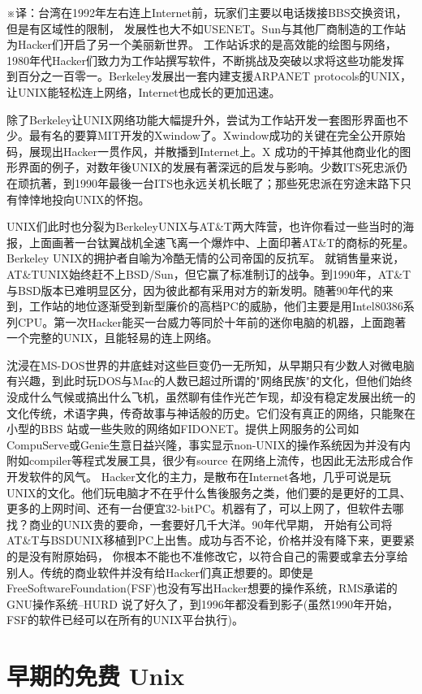 \documentclass[a4paper,12pt,UTF8,twoside]{ctexbook}
\begin{document}
※译：台湾在1992年左右连上Internet前，玩家们主要以电话拨接BBS交换资讯，但是有区域性的限制， 发展性也大不如USENET。Sun与其他厂商制造的工作站为Hacker们开启了另一个美丽新世界。 工作站诉求的是高效能的绘图与网络，1980年代Hacker们致力为工作站撰写软件，不断挑战及突破以求将这些功能发挥到百分之一百零一。Berkeley发展出一套内建支援ARPANET protocols的UNIX，让UNIX能轻松连上网络，Internet也成长的更加迅速。

除了Berkeley让UNIX网络功能大幅提升外，尝试为工作站开发一套图形界面也不少。最有名的要算MIT开发的Xwindow了。Xwindow成功的关键在完全公开原始码，展现出Hacker一贯作风，并散播到Internet上。X 成功的干掉其他商业化的图形界面的例子，对数年後UNIX的发展有著深远的启发与影响。少数ITS死忠派仍在顽抗著，到1990年最後一台ITS也永远关机长眠了；那些死忠派在穷途末路下只有悻悻地投向UNIX的怀抱。

UNIX们此时也分裂为BerkeleyUNIX与AT\&T两大阵营，也许你看过一些当时的海报，上面画著一台钛翼战机全速飞离一个爆炸中、上面印著AT\&T的商标的死星。Berkeley UNIX的拥护者自喻为冷酷无情的公司帝国的反抗军。 就销售量来说，AT\&TUNIX始终赶不上BSD/Sun，但它赢了标准制订的战争。到1990年，AT\&T与BSD版本已难明显区分，因为彼此都有采用对方的新发明。随著90年代的来到，工作站的地位逐渐受到新型廉价的高档PC的威胁，他们主要是用Intel80386系列CPU。第一次Hacker能买一台威力等同於十年前的迷你电脑的机器，上面跑著一个完整的UNIX，且能轻易的连上网络。

沈浸在MS-DOS世界的井底蛙对这些巨变仍一无所知，从早期只有少数人对微电脑有兴趣，到此时玩DOS与Mac的人数已超过所谓的"网络民族"的文化，但他们始终没成什么气候或搞出什么飞机，虽然聊有佳作光芒乍现，却没有稳定发展出统一的文化传统，术语字典，传奇故事与神话般的历史。它们没有真正的网络，只能聚在小型的BBS 站或一些失败的网络如FIDONET。提供上网服务的公司如CompuServe或Genie生意日益兴隆，事实显示non-UNIX的操作系统因为并没有内附如compiler等程式发展工具，很少有source 在网络上流传，也因此无法形成合作开发软件的风气。 Hacker文化的主力，是散布在Internet各地，几乎可说是玩UNIX的文化。他们玩电脑才不在乎什么售後服务之类，他们要的是更好的工具、更多的上网时间、还有一台便宜32-bitPC。机器有了，可以上网了，但软件去哪找？商业的UNIX贵的要命，一套要好几千大洋。90年代早期， 开始有公司将AT\&T与BSDUNIX移植到PC上出售。成功与否不论，价格并没有降下来，更要紧的是没有附原始码， 你根本不能也不准修改它，以符合自己的需要或拿去分享给别人。传统的商业软件并没有给Hacker们真正想要的。即使是FreeSoftwareFoundation(FSF)也没有写出Hacker想要的操作系统，RMS承诺的GNU操作系统--HURD 说了好久了，到1996年都没看到影子(虽然1990年开始，FSF的软件已经可以在所有的UNIX平台执行)。

\chapter{早期的免费 Unix}
\end{document}
